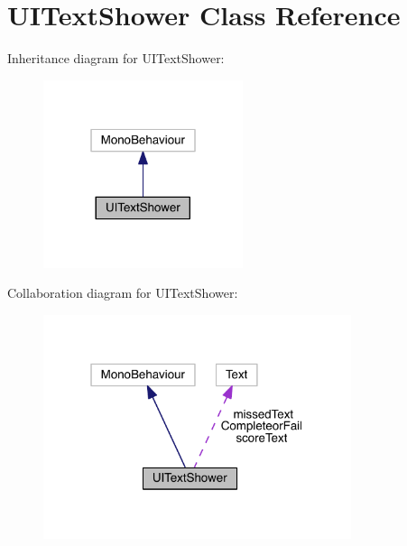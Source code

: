 \hypertarget{class_u_i_text_shower}{}\section{U\+I\+Text\+Shower Class Reference}
\label{class_u_i_text_shower}


Inheritance diagram for U\+I\+Text\+Shower\+:\nopagebreak
\begin{figure}[H]
\begin{center}
\leavevmode
\includegraphics[width=166pt]{class_u_i_text_shower__inherit__graph}
\end{center}
\end{figure}


Collaboration diagram for U\+I\+Text\+Shower\+:\nopagebreak
\begin{figure}[H]
\begin{center}
\leavevmode
\includegraphics[width=256pt]{class_u_i_text_shower__coll__graph}
\end{center}
\end{figure}
